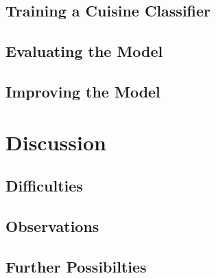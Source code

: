 \documentclass[11pt,a4paper]{article}
\begin{document}
\subsection{Training a Cuisine Classifier}
\subsection{Evaluating the Model}
\subsection{Improving the Model}

\section{Discussion}
\subsection{Difficulties}
\subsection{Observations}
\subsection{Further Possibilties}



\end{document}
